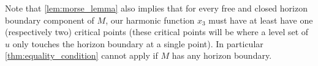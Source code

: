 \documentclass[titlepage,numbers=noenddot,oneside,%
cleardoublepage=empty,paper=a4,fontsize=11pt,%
english,%
]{scrartcl}
\begin{document}
Note that \cref{lem:morse_lemma} also implies that for every free and closed horizon boundary component of \( M \), our harmonic function \( x_3 \) must have at least have one (respectively two) critical points (these critical points will be where a level set of \( u \) only touches the horizon boundary at a single point). In particular \cref{thm:equality_condition} cannot apply if \( M \) has any horizon boundary.
\end{document}
